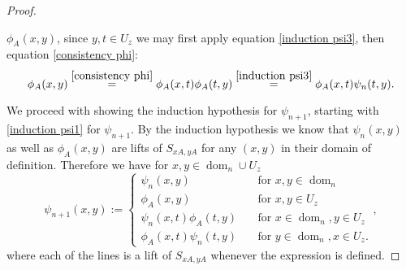 \documentclass[b5paper,draft,openbib,12pt]{memoir}
\DeclareMathOperator{\dom}{dom}
\begin{document}
\begin{proof}
\begin{enumerate}
  \(\phi_A(x,y)\), since \(y,t\in U_z\) we may first apply equation \eqref{induction psi3}, then equation \eqref{consistency phi}:
    \begin{equation}
  \phi_A(x,y)\overset{\eqref{consistency phi}}{=}\phi_A(x,t)\phi_A(t,y)\overset{\eqref{induction psi3}}{=}\phi_A(x,t)\psi_n(t,y).
  \end{equation}
  \end{enumerate}
We proceed with showing the induction hypothesis for \(\psi_{n+1}\), 
starting with \eqref{induction psi1} for \(\psi_{n+1}\). By the induction hypothesis we know that \(\psi_n(x,y)\) as well as 
\(\phi_A(x,y)\) are lifts of \(S_{xA,yA}\) for any \((x,y)\) in their domain of definition. Therefore we have for \(x,y\in \dom_n \cup U_z\)
 \begin{equation}
 \psi_{n+1}(x,y):=\left\{\begin{matrix}
 \psi_n(x,y) \quad &\text{for }x,y\in \dom_n\\
 \phi_A(x,y) \quad &\text{for } x,y\in U_z\\
 \psi_n(x,t)\phi_A(t,y)\quad &\text{for } x\in \dom_n, y\in U_z\\
 \phi_A(x,t)\psi_n(t,y)\quad &\text{for } y\in \dom_n, x\in U_z.
 \end{matrix} \right.,
 \end{equation} 
where each of the lines is a lift of \(S_{xA,y A}\) whenever the expression is defined.



\end{proof}
\end{document}
